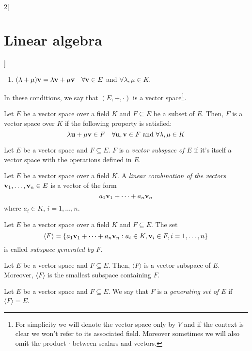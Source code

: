 \documentclass[../../../main.tex]{subfiles}
\begin{document}
\begin{multicols}{2}[\section{Linear algebra}]
\begin{definition}
\begin{enumerate}
        \item $(\lambda+\mu)\vb{v}=\lambda\vb{v}+\mu\vb{v}\quad\forall\vb{v}\in E$ and $\forall\lambda,\mu\in K$.
    \end{enumerate}
    In these conditions, we say that $(E,+,\cdot)$ is a vector space\footnote{For simplicity we will denote the vector space only by $V$ and if the context is clear we won't refer to its associated field. Moreover sometimes we will also omit the product $\cdot$ between scalars and vectors.}.
\end{definition}
\begin{definition}
    Let $E$ be a vector space over a field $K$ and $F\subseteq E$ be a subset of $E$. Then, $F$ is a vector space over $K$ if the following property is satisfied:
    $$\lambda \vb{u}+\mu \vb{v}\in F\quad\forall \vb{u},\vb{v}\in F\text{ and }\forall\lambda,\mu\in K$$
\end{definition}
\begin{definition}
    Let $E$ be a vector space and $F\subseteq E$. $F$ is a \textit{vector subspace of $E$} if it's itself a vector space with the operations defined in $E$.
\end{definition}
\begin{definition}
    Let $E$ be a vector space over a field $K$. A \textit{linear combination of the vectors $\vb{v}_1,\ldots,\vb{v}_n\in E$} is a vector of the form $$a_1\vb{v}_1+\cdots+a_n\vb{v}_n$$ where $a_i\in K$, $i=1,\ldots,n$. 
\end{definition}
\begin{definition}
    Let $E$ be a vector space over a field $K$ and $F\subseteq E$. The set $$\langle F\rangle=\{a_1\vb{v}_1+\cdots+a_n\vb{v}_n:a_i\in K,\vb{v}_i\in F,i=1,\ldots,n\}$$ is called \textit{subspace generated by $F$}.
\end{definition}
\begin{lemma}
    Let $E$ be a vector space and $F\subseteq E$. Then, $\langle F\rangle$ is a vector subspace of $E$. Moreover, $\langle F\rangle$ is the smallest subspace containing $F$.
\end{lemma}
\begin{definition}
    Let $E$ be a vector space and $F\subseteq E$. We say that $F$ is a \textit{generating set of $E$} if $\langle F\rangle=E$.
\end{definition}

\end{multicols}
\end{document}

